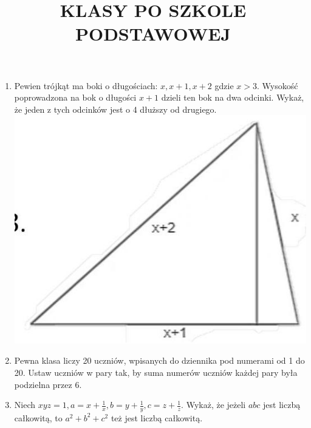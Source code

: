 \documentclass[10pt]{article}
\title{KLASY PO SZKOLE PODSTAWOWEJ }
\author{}
\date{}
\begin{document}
\maketitle
\begin{enumerate}
  \item Pewien trójkąt ma boki o długościach: \(x, x+1, x+2\) gdzie \(x>3\). Wysokość poprowadzona na bok o długości \(x+1\) dzieli ten bok na dwa odcinki. Wykaż, że jeden z tych odcinków jest o 4 dłuższy od drugiego.\\
\includegraphics[max width=\textwidth, center]{2024_11_21_4f01d8a613fbbdc215e5g-1}
  \item Pewna klasa liczy 20 uczniów, wpisanych do dziennika pod numerami od 1 do 20. Ustaw uczniów w pary tak, by suma numerów uczniów każdej pary była podzielna przez 6.
  \item Niech \(x y z=1, a=x+\frac{1}{x}, b=y+\frac{1}{y}, c=z+\frac{1}{z}\). Wykaż, że jeżeli \(a b c\) jest liczbą całkowitą, to \(a^{2}+b^{2}+c^{2}\) też jest liczbą całkowitą.
\end{enumerate}
\end{document}
